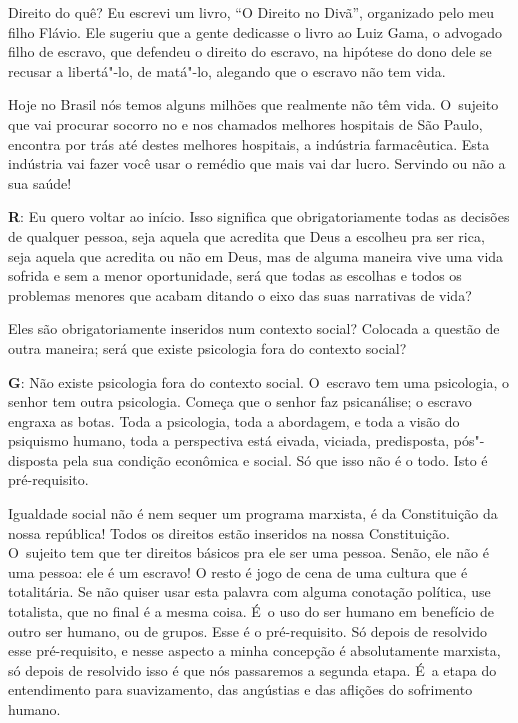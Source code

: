  

Direito do quê? Eu escrevi um livro, ``O Direito no Divã'', organizado
pelo meu filho Flávio. Ele sugeriu que a gente dedicasse o livro ao Luiz
Gama, o advogado filho de escravo, que defendeu o direito
do escravo, na hipótese do dono dele se recusar a libertá"-lo, de
matá"-lo, alegando que o escravo não tem vida.

 

Hoje no Brasil nós temos alguns milhões que realmente não têm vida. O~sujeito que vai procurar socorro no  e nos chamados melhores
hospitais de São Paulo, encontra por trás até destes melhores hospitais,
a indústria farmacêutica. Esta indústria vai fazer você usar o remédio
que mais vai dar lucro. Servindo ou não a sua saúde!

 

\textbf{R}: Eu quero voltar ao início. Isso significa que
obrigatoriamente todas as decisões de qualquer pessoa, seja aquela que
acredita que Deus a escolheu pra ser rica, seja aquela que acredita ou
não em Deus, mas de alguma maneira vive uma vida sofrida e sem a menor
oportunidade, será que todas as escolhas e todos os problemas menores
que acabam ditando o eixo das suas narrativas de vida?

 

Eles são obrigatoriamente inseridos num contexto social? Colocada a
questão de outra maneira; será que existe psicologia fora do contexto
social?

 

\textbf{G}: Não existe psicologia fora do contexto social. O~escravo tem
uma psicologia, o senhor tem outra psicologia. Começa que o senhor faz
psicanálise; o escravo engraxa as botas. Toda a psicologia, toda a
abordagem, e toda a visão do psiquismo humano, toda a perspectiva está
eivada, viciada, predisposta, pós"-disposta pela sua condição econômica e
social. Só que isso não é o todo. Isto é pré-requisito.

 

Igualdade social não é nem sequer um programa marxista, é da
Constituição da nossa república! Todos os direitos estão inseridos na
nossa Constituição. O~sujeito tem que ter direitos básicos pra ele ser
uma pessoa. Senão, ele não é uma pessoa: ele é um escravo! O resto é jogo
de cena de uma cultura que é totalitária. Se não quiser usar esta
palavra com alguma conotação política, use totalista, que no final é a
mesma coisa. É~o uso do ser humano em benefício de outro ser humano, ou
de grupos. Esse é o pré-requisito. Só depois de resolvido esse pré-requisito,
e nesse aspecto a minha concepção é absolutamente marxista,
só depois de resolvido isso é que nós passaremos a segunda etapa. É~a
etapa do entendimento para suavizamento, das angústias e das aflições do
sofrimento humano.

